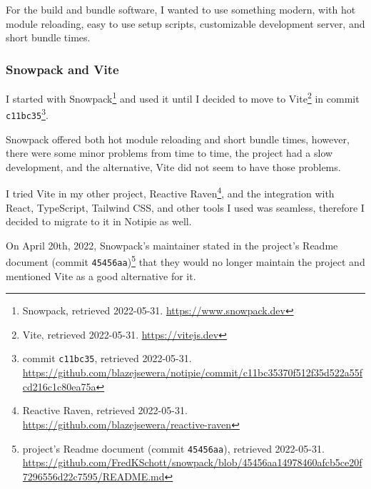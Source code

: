 For the build and bundle software, I wanted to use something modern,
with hot module reloading, easy to use setup scripts, customizable
development server, and short bundle times.

\subsubsection{Snowpack and Vite}\label{snowpack-and-vite}

I started with Snowpack\footnote{Snowpack, retrieved 2022-05-31.
\url{https://www.snowpack.dev}} and used it until I decided to move to
Vite\footnote{Vite, retrieved 2022-05-31. \url{https://vitejs.dev}} in
commit \texttt{c11bc35}\footnote{commit \texttt{c11bc35}, retrieved
2022-05-31.
\url{https://github.com/blazejsewera/notipie/commit/c11bc35370f512f35d522a55fcd216c1c80ea75a}}.

Snowpack offered both hot module reloading and short bundle times,
however, there were some minor problems from time to time, the project
had a slow development, and the alternative, Vite did not seem to have
those problems.

I tried Vite in my other project, Reactive Raven\footnote{Reactive
Raven, retrieved 2022-05-31.
\url{https://github.com/blazejsewera/reactive-raven}}, and the
integration with React, TypeScript, Tailwind CSS, and other tools I used
was seamless, therefore I decided to migrate to it in Notipie as well.

On April 20th, 2022, Snowpack's maintainer stated in the project's
Readme document (commit \texttt{45456aa})\footnote{project's Readme
document (commit \texttt{45456aa}), retrieved 2022-05-31.
\url{https://github.com/FredKSchott/snowpack/blob/45456aa14978460afcb5ce20f7296556d22c7595/README.md}}
that they would no longer maintain the project and mentioned Vite as a
good alternative for it.
